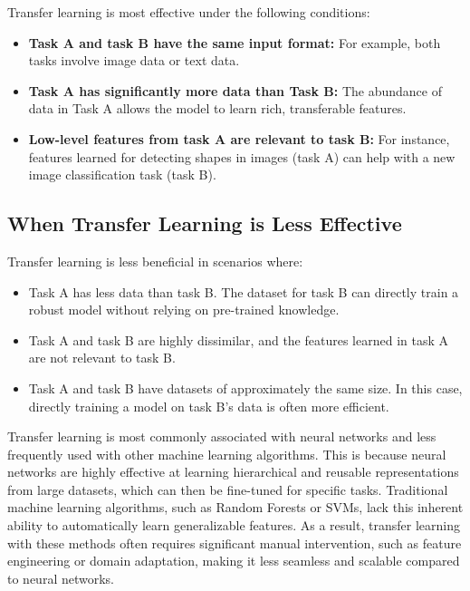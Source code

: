 \documentclass[12pt,openany, draft]{book}
\begin{document}
Transfer learning is most effective under the following conditions:
\begin{itemize}
    \item \textbf{Task A and task B have the same input format:} For example, both tasks involve image data or text data.
    \item \textbf{Task A has significantly more data than Task B:} The abundance of data in Task A allows the model to learn rich, transferable features.
    \item \textbf{Low-level features from task A are relevant to task B:} For instance, features learned for detecting shapes in images (task A) can help with a new image classification task (task B).
\end{itemize}


\subsection{When Transfer Learning is Less Effective}

Transfer learning is less beneficial in scenarios where:
\begin{itemize}
    \item Task A has less data than task B. The dataset for task B can directly train a robust model without relying on pre-trained knowledge.
    \item Task A and task B are highly dissimilar, and the features learned in task A are not relevant to task B.
    \item Task A and task B have datasets of approximately the same size. In this case, directly training a model on task B’s data is often more efficient.
\end{itemize}

\vspace{0.5cm}

\begin{notebox}
Transfer learning is most commonly associated with neural networks and less frequently used with other machine learning algorithms. This is because neural networks are highly effective at learning hierarchical and reusable representations from large datasets, which can then be fine-tuned for specific tasks. Traditional machine learning algorithms, such as Random Forests or SVMs, lack this inherent ability to automatically learn generalizable features. As a result, transfer learning with these methods often requires significant manual intervention, such as feature engineering or domain adaptation, making it less seamless and scalable compared to neural networks.
\end{notebox}
\end{document}

